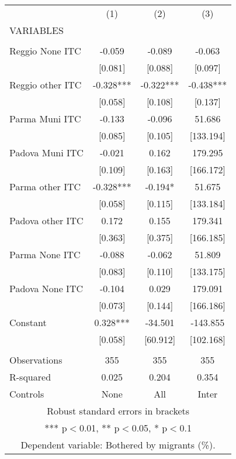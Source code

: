 \begin{tabular}{lccc} \hline
 & (1) & (2) & (3) \\
VARIABLES &  &  &  \\ \hline
 &  &  &  \\
Reggio None ITC & -0.059 & -0.089 & -0.063 \\
 & [0.081] & [0.088] & [0.097] \\
Reggio other ITC & -0.328*** & -0.322*** & -0.438*** \\
 & [0.058] & [0.108] & [0.137] \\
Parma Muni ITC & -0.133 & -0.096 & 51.686 \\
 & [0.085] & [0.105] & [133.194] \\
Padova Muni ITC & -0.021 & 0.162 & 179.295 \\
 & [0.109] & [0.163] & [166.172] \\
Parma other ITC & -0.328*** & -0.194* & 51.675 \\
 & [0.058] & [0.115] & [133.184] \\
Padova other ITC & 0.172 & 0.155 & 179.341 \\
 & [0.363] & [0.375] & [166.185] \\
Parma None ITC & -0.088 & -0.062 & 51.809 \\
 & [0.083] & [0.110] & [133.175] \\
Padova None ITC & -0.104 & 0.029 & 179.091 \\
 & [0.073] & [0.144] & [166.186] \\
Constant & 0.328*** & -34.501 & -143.855 \\
 & [0.058] & [60.912] & [102.168] \\
 &  &  &  \\
Observations & 355 & 355 & 355 \\
R-squared & 0.025 & 0.204 & 0.354 \\
 Controls & None & All & Inter \\ \hline
\multicolumn{4}{c}{ Robust standard errors in brackets} \\
\multicolumn{4}{c}{ *** p$<$0.01, ** p$<$0.05, * p$<$0.1} \\
\multicolumn{4}{c}{ Dependent variable: Bothered by migrants (\%).} \\
\end{tabular}
